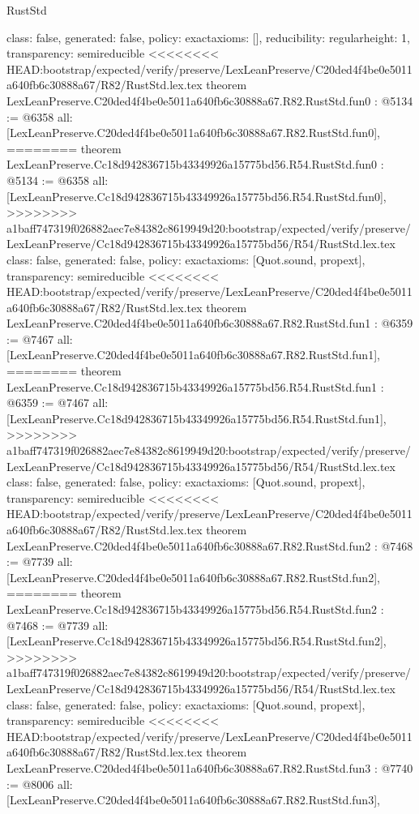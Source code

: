 \begin{lexlean}{RustStd}
\begin{coremodule}
{\begin{coremodule}
{{{  class: false,
  generated: false,
  policy: exact{axioms: []},
  reducibility: regular{height: 1},
  transparency: semireducible
}
<<<<<<<< HEAD:bootstrap/expected/verify/preserve/LexLeanPreserve/C20ded4f4be0e5011a640fb6c30888a67/R82/RustStd.lex.tex
theorem LexLeanPreserve.C20ded4f4be0e5011a640fb6c30888a67.R82.RustStd.fun0 : @5134 := @6358 {
  all: [LexLeanPreserve.C20ded4f4be0e5011a640fb6c30888a67.R82.RustStd.fun0],
========
theorem LexLeanPreserve.Cc18d942836715b43349926a15775bd56.R54.RustStd.fun0 : @5134 := @6358 {
  all: [LexLeanPreserve.Cc18d942836715b43349926a15775bd56.R54.RustStd.fun0],
>>>>>>>> a1baff747319f026882aec7e84382c8619949d20:bootstrap/expected/verify/preserve/LexLeanPreserve/Cc18d942836715b43349926a15775bd56/R54/RustStd.lex.tex
  class: false,
  generated: false,
  policy: exact{axioms: [Quot.sound, propext]},
  transparency: semireducible
}
<<<<<<<< HEAD:bootstrap/expected/verify/preserve/LexLeanPreserve/C20ded4f4be0e5011a640fb6c30888a67/R82/RustStd.lex.tex
theorem LexLeanPreserve.C20ded4f4be0e5011a640fb6c30888a67.R82.RustStd.fun1 : @6359 := @7467 {
  all: [LexLeanPreserve.C20ded4f4be0e5011a640fb6c30888a67.R82.RustStd.fun1],
========
theorem LexLeanPreserve.Cc18d942836715b43349926a15775bd56.R54.RustStd.fun1 : @6359 := @7467 {
  all: [LexLeanPreserve.Cc18d942836715b43349926a15775bd56.R54.RustStd.fun1],
>>>>>>>> a1baff747319f026882aec7e84382c8619949d20:bootstrap/expected/verify/preserve/LexLeanPreserve/Cc18d942836715b43349926a15775bd56/R54/RustStd.lex.tex
  class: false,
  generated: false,
  policy: exact{axioms: [Quot.sound, propext]},
  transparency: semireducible
}
<<<<<<<< HEAD:bootstrap/expected/verify/preserve/LexLeanPreserve/C20ded4f4be0e5011a640fb6c30888a67/R82/RustStd.lex.tex
theorem LexLeanPreserve.C20ded4f4be0e5011a640fb6c30888a67.R82.RustStd.fun2 : @7468 := @7739 {
  all: [LexLeanPreserve.C20ded4f4be0e5011a640fb6c30888a67.R82.RustStd.fun2],
========
theorem LexLeanPreserve.Cc18d942836715b43349926a15775bd56.R54.RustStd.fun2 : @7468 := @7739 {
  all: [LexLeanPreserve.Cc18d942836715b43349926a15775bd56.R54.RustStd.fun2],
>>>>>>>> a1baff747319f026882aec7e84382c8619949d20:bootstrap/expected/verify/preserve/LexLeanPreserve/Cc18d942836715b43349926a15775bd56/R54/RustStd.lex.tex
  class: false,
  generated: false,
  policy: exact{axioms: [Quot.sound, propext]},
  transparency: semireducible
}
<<<<<<<< HEAD:bootstrap/expected/verify/preserve/LexLeanPreserve/C20ded4f4be0e5011a640fb6c30888a67/R82/RustStd.lex.tex
theorem LexLeanPreserve.C20ded4f4be0e5011a640fb6c30888a67.R82.RustStd.fun3 : @7740 := @8006 {
  all: [LexLeanPreserve.C20ded4f4be0e5011a640fb6c30888a67.R82.RustStd.fun3],
}}}}}}
\end{coremodule}}
\end{coremodule}
\end{lexlean}
